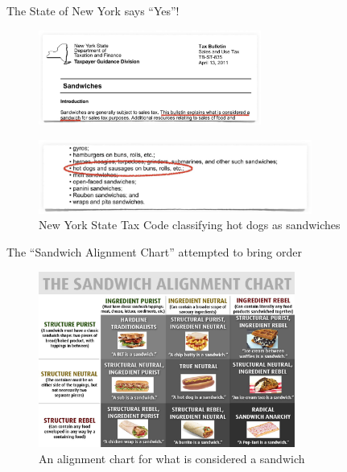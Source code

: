 \documentclass{beamer}
\begin{document}
\begin{frame}{The State of New York says ``Yes''!}
    \begin{figure}
        \includegraphics[width=0.65\textwidth]{ny_sandwich_law_1.jpg}
        \label{fig:ny-sandwich-law-top}
    \end{figure}
    \begin{figure}
        \includegraphics[width=0.8\textwidth]{ny_sandwich_law_2.jpg}
        \caption{\label{fig:ny-sandwich-law-bottom}New York State Tax Code classifying hot dogs as sandwiches}
    \end{figure}
\end{frame}

\begin{frame}{The ``Sandwich Alignment Chart'' attempted to bring order}
    \begin{figure}
        \includegraphics[width=0.75\textwidth]{sandwich_alignment.jpg}
        \caption{\label{fig:sandwich-alignment}An alignment chart for what is considered a sandwich \cite{noauthor_matttomic_nodate}}
    \end{figure}
\end{frame}
\end{document}
